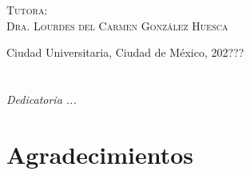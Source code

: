 \documentclass[8pt,leqno,pdflatex,spanish]{book}
\theoremstyle{plain}
\theoremstyle{definition}
\theoremstyle{remark}
\begin{document}
\begin{titlepage}
\begin{minipage}[c][0.81\textheight][t]{0.75\textwidth}
\begin{center}
\vspace{0.5cm}

{\large\scshape Tutora:\\[0.3cm] {Dra. Lourdes del Carmen Gonz\'alez 
Huesca}}\\[.2in]

\vspace{0.5cm}

\large{Ciudad Universitaria, Ciudad de México,}{ }{202???}
\end{center}
\end{minipage}
\end{titlepage}



\frontmatter
\chapter*{}
\begin{flushright}%
\emph{Dedicatoria ...}
\thispagestyle{empty}
\end{flushright}

\chapter{Agradecimientos}



\tableofcontents
\listoffigures
\renewcommand\listingscaption{C\'odigo}
\renewcommand\listoflistingscaption{\'Indice de c\'odigos}
\listoflistings


\mainmatter







% 
% 
% 
% 
% 
% 
% 




\backmatter%
\end{document}
